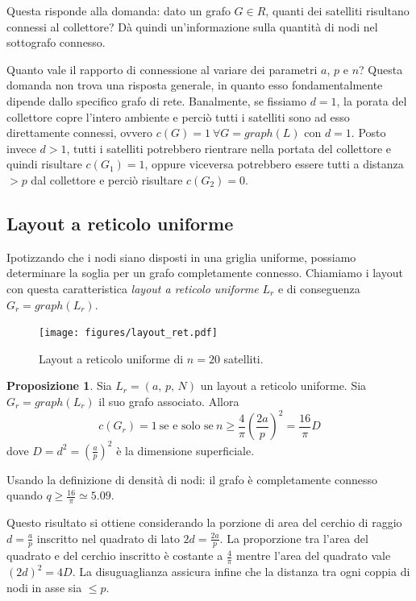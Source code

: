 \documentclass[a4paper,11pt]{article}
\theoremstyle{definition}
\newtheorem{proposition}{Proposizione}
\begin{document}
Questa risponde alla domanda: dato un grafo $G \in R$, quanti dei satelliti risultano connessi al collettore? Dà quindi un'informazione sulla quantità di nodi nel sottografo connesso.

Quanto vale il rapporto di connessione al variare dei parametri $a$, $p$ e $n$? Questa domanda non trova una risposta generale, in quanto esso fondamentalmente dipende dallo specifico grafo di rete. Banalmente, se fissiamo $d = 1$, la porata del collettore copre l'intero ambiente e perciò tutti i satelliti sono ad esso direttamente connessi, ovvero $c(G) = 1 \ \forall G = graph(L)$ con $d = 1$. Posto invece $d > 1$, tutti i satelliti potrebbero rientrare nella portata del collettore e quindi risultare $c(G_1) = 1$, oppure viceversa potrebbero essere tutti a distanza $> p$ dal collettore e perciò risultare $c(G_2) = 0$.

\subsection{Layout a reticolo uniforme}

Ipotizzando che i nodi siano disposti in una griglia uniforme, possiamo determinare la soglia per un grafo completamente connesso. Chiamiamo i layout con questa caratteristica \emph{layout a reticolo uniforme} $L_r$ e di conseguenza $G_r = graph(L_r)$.

\begin{figure}[H]
\centering
\texttt{[image: figures/layout\_ret.pdf]}
\caption{Layout a reticolo uniforme di $n=20$ satelliti.}
\end{figure}

\begin{proposition}
Sia $L_r = (a,\,p,\,N)$ un layout a reticolo uniforme. Sia $G_r = graph(L_r)$ il suo grafo associato. Allora
\begin{equation*}
c(G_r) = 1 \ \text{se e solo se} \ n \geq \frac{4}{\pi} \left(\frac{2a}{p}\right)^2 = \frac{16}{\pi} D
\end{equation*}
dove $D = d^2 = \left(\frac{a}{p}\right)^2$ è la dimensione superficiale.
\end{proposition}

Usando la definizione di densità di nodi: il grafo è completamente connesso quando $q \geq \frac{16}{\pi} \simeq 5.09$.

Questo risultato si ottiene considerando la porzione di area del cerchio di raggio $d = \frac{a}{p}$ inscritto nel quadrato di lato $2d = \frac{2a}{p}$. La proporzione tra l'area del quadrato e del cerchio inscritto è costante a $\frac{4}{\pi}$ mentre l'area del quadrato vale $(2d)^2 = 4D$. La disuguaglianza assicura infine che la distanza tra ogni coppia di nodi in asse sia $\leq p$.
\end{document}
